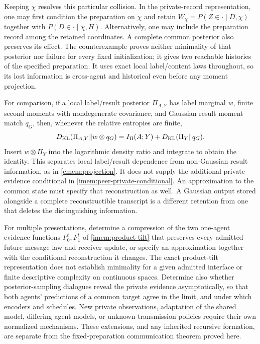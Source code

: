 Keeping $\chi$ resolves this particular collision. In the private-record representation, one may first condition the preparation on $\chi$ and retain $W_\chi=P(Z\in\cdot\mid D,\chi)$ together with $P(D\in\cdot\mid \chi,H)$. Alternatively, one may include the preparation record among the retained coordinates. A complete common posterior also preserves its effect. The counterexample proves neither minimality of that posterior nor failure for every fixed initialization; it gives two reachable histories of the specified preparation. It uses exact local label/content laws throughout, so its lost information is cross-agent and historical even before any moment projection.

For comparison, if a local label/result posterior $\Pi_{A,Y}$ has label marginal $w$, finite second moments with nondegenerate covariance, and Gaussian result moment match $q_G$, then, whenever the relative entropies are finite,
\begin{equation}
 D_{\mathrm{KL}}(\Pi_{A,Y}\Vert w\otimes q_G)
 =I_\Pi(A;Y)+D_{\mathrm{KL}}(\Pi_Y\Vert q_G).
 \label{imem:projection-loss}
\end{equation}
Insert $w\otimes\Pi_Y$ into the logarithmic density ratio and integrate to obtain the identity. This separates local label/result dependence from non-Gaussian result information, as in \cref{cmem:projection}. It does not supply the additional private-evidence conditional in \cref{imem:peer-private-conditional}. An approximation to the common state must specify that reconstruction as well. A Gaussian output stored alongside a complete reconstructible transcript is a different retention from one that deletes the distinguishing information.

For multiple presentations, determine a compression of the two one-agent evidence functions $F_0^t,F_1^t$ of \cref{imem:product-tilt} that preserves every admitted future message law and receiver update, or specify an approximation together with the conditional reconstruction it changes. The exact product-tilt representation does not establish minimality for a given admitted interface or finite descriptive complexity on continuous spaces. Determine also whether posterior-sampling dialogues reveal the private evidence asymptotically, so that both agents' predictions of a common target agree in the limit, and under which encoders and schedules. New private observations, adaptation of the shared model, differing agent models, or unknown transmission policies require their own normalized mechanisms. These extensions, and any inherited recursive formation, are separate from the fixed-preparation communication theorem proved here.
